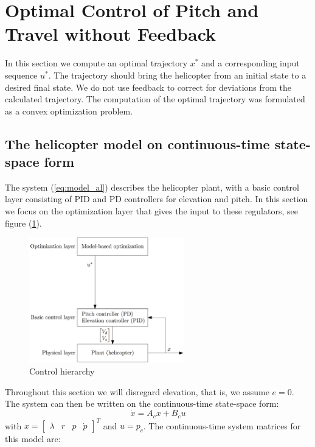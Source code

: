 \section{Optimal Control of Pitch and Travel without Feedback}\label{sec:prob2}

In this section we compute an optimal trajectory $x^*$ and a corresponding input sequence $u^*$. The trajectory should bring the helicopter from an initial state to a desired final state. We do not use feedback to correct for deviations from the calculated trajectory. The computation of the optimal trajectory was formulated as a convex optimization problem.

\subsection{The helicopter model on continuous-time state-space form}
The system (\ref{eq:model_al}) describes the helicopter plant, with a basic control layer consisting of PID and PD controllers for elevation and pitch. In this section we focus on the optimization layer that gives the input to these regulators, see figure (\ref{fig:control_hierarchy}).
\begin{figure}[ht]
    \centering
    \includegraphics[width=0.6\textwidth]{figures/day2/control_hierarchy_day2}
    \caption{Control hierarchy}
    \label{fig:control_hierarchy}
\end{figure}
Throughout this section we will disregard elevation, that is, we assume $e = 0$.
The system can then be written on the continuous-time state-space form:
\begin{equation}
    \dot{x} = A_cx + B_cu
    \label{eq:state_space_axbu}
\end{equation}
with $x = \begin{bmatrix} \lambda & r & p & \dot{p} \end{bmatrix}^T$ and $u = p_c$.
The continuous-time system matrices for this model are:

